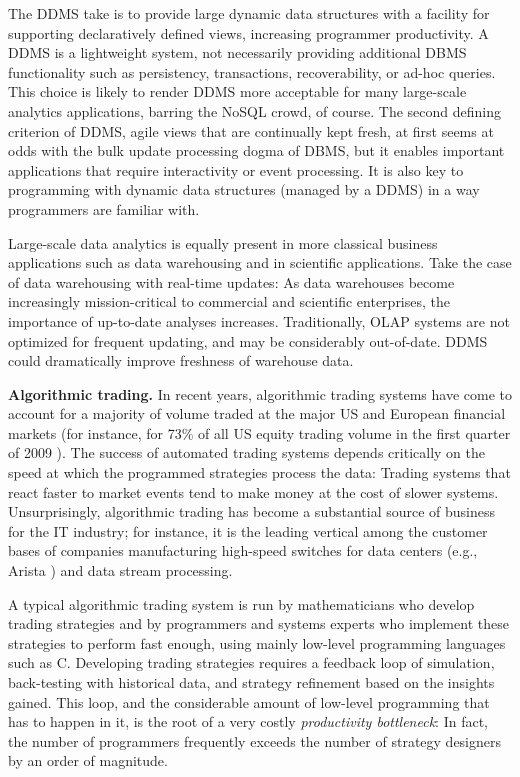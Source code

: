 The DDMS take is to provide large dynamic data structures with a facility for supporting declaratively defined views, increasing programmer productivity. A DDMS is a lightweight system, not necessarily providing additional DBMS functionality such as persistency, transactions, recoverability, or ad-hoc queries. This choice is likely to render DDMS more acceptable for many large-scale analytics applications, barring the NoSQL crowd, of course. The second defining criterion of DDMS, agile views that are continually kept fresh, at first seems at odds with the bulk update processing dogma of DBMS, but it enables important applications that require interactivity or event processing. It is also key to programming with dynamic data structures (managed by a DDMS) in a way programmers are familiar with.

Large-scale data analytics is equally present in more classical business applications such as data warehousing and in scientific applications. Take the case of data warehousing with real-time updates:
As data warehouses become increasingly mission-critical to commercial and scientific enterprises, the importance of up-to-date analyses increases. Traditionally, OLAP systems are not optimized for frequent updating, and may be considerably out-of-date. DDMS could dramatically improve freshness of warehouse data.

\medskip


{\bf Algorithmic trading.}\/
In recent years, algorithmic trading systems have come to account for a majority of volume traded at the major US and European financial markets (for instance, for 73\% of all US equity trading volume in the first quarter of 2009 \cite{Iati2009}). The success of automated trading systems depends critically on the speed at which the programmed strategies process the data: Trading systems that react faster to market events tend to make money at the cost of slower systems.
Unsurprisingly, algorithmic trading has become a substantial source of business for the IT industry; for instance, it is the leading vertical among the customer bases of companies manufacturing high-speed switches for data centers
(e.g., Arista \cite{Becht2010}) and data stream processing.

A typical algorithmic trading system is run by mathematicians who develop trading strategies and by programmers and systems experts who implement these strategies to perform fast enough, using mainly low-level programming languages such as C. Developing trading strategies requires a feedback loop of simulation, back-testing with historical data, and strategy refinement based on the insights gained. This loop, and the considerable amount of low-level programming that has to happen in it, is the root of a very costly {\em productivity bottleneck}\/: In fact, the number of programmers frequently exceeds the number of strategy designers by an order of magnitude.

